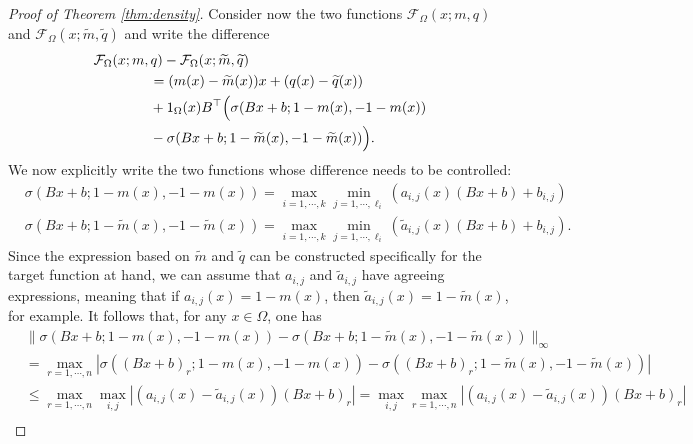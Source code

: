 \documentclass{article}
\newcommand{\R}{\mathbb{R}}
\theoremstyle{plain}
\theoremstyle{definition}
\theoremstyle{definition}
\theoremstyle{remark}
\theoremstyle{definition}
\theoremstyle{definition}
\theoremstyle{remark}
\numberwithin{equation}{section}
\begin{document}
\begin{proof}[Proof of Theorem \ref{thm:density}]
Consider now the two functions $\mathcal{F}_{\Omega}(x;m,q)$ and $\mathcal{F}_{\Omega}(x;\widetilde{m},\widetilde{q})$
and write the difference
\[
\begin{split}
&\mathcal{F}_{\Omega}(x;m,q)-\mathcal{F}_\Omega(x;\widetilde{m},\widetilde{q})\\
& \qquad \qquad = (m(x)-\widetilde{m}(x))x + (q(x)-\widetilde{q}(x))\\
& \qquad \qquad +1_{\Omega}(x)B^\top\Bigl(\sigma(Bx+b;1-m(x),-1-m(x))\\
& \qquad \qquad - \sigma(Bx+b;1-\widetilde{m}(x),-1-\widetilde{m}(x))\Bigr).
\end{split}
\]
We now explicitly write the two functions whose difference needs to be controlled:
\[
\begin{split}
& \sigma(Bx+b;1-m(x),-1-m(x))= \max_{i=1,\cdots,k}\min_{j=1,\cdots,\ell_i}(a_{i,j}(x)(Bx+b) + b_{i,j}) \\
&\sigma(Bx+b;1-\widetilde{m}(x),-1-\widetilde{m}(x)) = \max_{i=1,\cdots,k}\min_{j=1,\cdots,\ell_i}(\widetilde{a}_{i,j}(x)(Bx+b) + {b}_{i,j}).
\end{split}
\]
Since the expression based on $\widetilde{m}$ and $\widetilde{q}$ can be constructed specifically for the target function at hand, we can assume that $a_{i,j}$ and $\widetilde{a}_{i,j}$ have agreeing expressions, meaning that if $a_{i,j}(x)=1-m(x)$, then $\widetilde{a}_{i,j}(x)=1-\widetilde{m}(x)$, for example. It follows that, for any $x\in\Omega$, one has
\[
\begin{split}
&\|\sigma(Bx+b;1-m(x),-1-m(x))-\sigma(Bx+b;1-\widetilde{m}(x),-1-\widetilde{m}(x))\|_\infty\\
&=\max_{r=1,\cdots,n} |\sigma((Bx+b)_r;1-m(x),-1-m(x))-\sigma((Bx+b)_r;1-\widetilde{m}(x),-1-\widetilde{m}(x))| \\
&\leq \max_{r=1,\cdots,n} \max_{i,j}|(a_{i,j}(x)-\widetilde{a}_{i,j}(x))(Bx+b)_r| = \max_{i,j} \max_{r=1,\cdots,n} |(a_{i,j}(x)-\widetilde{a}_{i,j}(x))(Bx+b)_r|\\

\end{split}\]
\end{proof}
\end{document}
